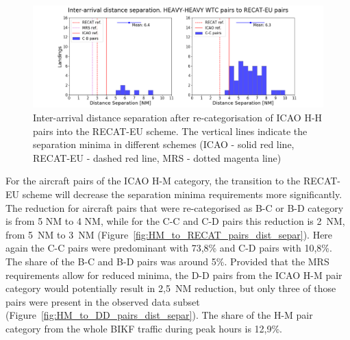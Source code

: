 \begin{figure}[h]
    \centering
    \includegraphics[width=1\textwidth]{graphics/fig_HH_to_RECAT_pairs_dist_separ.png}
    \caption[Inter-arrival distance separation of ICAO H-H pairs into the RECAT-EU scheme]{Inter-arrival distance separation after re-categorisation of ICAO H-H pairs into the RECAT-EU scheme. The vertical lines indicate the separation minima in different schemes (ICAO - solid red line, RECAT-EU - dashed red line, MRS - dotted magenta line)}
    \label{fig:HH_to_RECAT_pairs_dist_separ}
\end{figure}

For the aircraft pairs of the ICAO H-M category, the transition to the RECAT-EU scheme will decrease the separation minima requirements more significantly. The reduction for aircraft pairs that were re-categorised as B-C or B-D category is from 5 NM to 4 NM, while for the C-C and C-D pairs this reduction is 2~NM, from 5~NM to 3~NM (Figure~\ref{fig:HM_to_RECAT_pairs_dist_separ}). Here again the C-C pairs were predominant with 73,8\% and C-D pairs with 10,8\%. The share of the B-C and B-D pairs was around 5\%. Provided that the MRS requirements allow for reduced minima, the D-D pairs from the ICAO H-M pair category would potentially result in 2,5~NM reduction, but only three of those pairs were present in the observed data subset (Figure~\ref{fig:HM_to_DD_pairs_dist_separ}). The share of the H-M pair category from the whole BIKF traffic during peak hours is 12,9\%.

